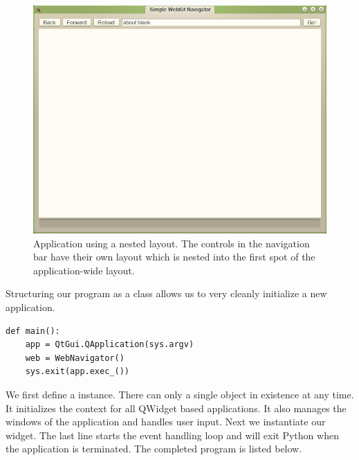 \begin{figure}[h]
\centering
\includegraphics[scale=.5]{layout.png}
\caption{Application using a nested layout.  The controls in the navigation bar
have their own layout which is nested into the first spot of the application-wide layout.}
\label{fig:withlayout}
\end{figure}

Structuring our program as a class allows us to very cleanly initialize a new application.
\begin{lstlisting}
def main():
    app = QtGui.QApplication(sys.argv)
    web = WebNavigator()
    sys.exit(app.exec_())
\end{lstlisting}
We first define a  instance.  There can only a single  object in existence at any time.  It initializes the context for all QWidget based applications.  It also manages the windows of the application and handles user input.  Next we instantiate our  widget.  The last line starts the event handling loop and will exit Python when the application is terminated.  The completed program is listed below.


